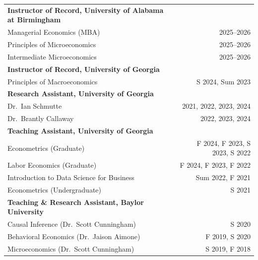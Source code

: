 \documentclass[11pt,letterpaper]{article}
\begin{document}
\begin{tabularx}{\textwidth}{@{}Xr@{}}
    \textbf{Instructor of Record, University of Alabama at Birmingham} & \\
    \hspace{2em} Managerial Economics (MBA) & 2025--2026 \\
    \hspace{2em} Principles of Microeconomics & 2025--2026 \\
    \hspace{2em} Intermediate Microeconomics & 2025--2026 \\[4pt]
    \textbf{Instructor of Record, University of Georgia} & \\
    \hspace{2em} Principles of Macroeconomics & S 2024, Sum 2023 \\[4pt]
    \textbf{Research Assistant, University of Georgia} & \\
    \hspace{2em} Dr.\ Ian Schmutte & 2021, 2022, 2023, 2024 \\
    \hspace{2em} Dr.\ Brantly Callaway & 2022, 2023, 2024 \\[4pt]
    \textbf{Teaching Assistant, University of Georgia} & \\
    \hspace{2em} Econometrics (Graduate) & F 2024, F 2023, S 2023, S 2022 \\
    \hspace{2em} Labor Economics (Graduate) & F 2024, F 2023, F 2022 \\
    \hspace{2em} Introduction to Data Science for Business & Sum 2022, F 2021 \\
    \hspace{2em} Econometrics (Undergraduate) & S 2021 \\[4pt]
    \textbf{Teaching \& Research Assistant, Baylor University} & \\
    \hspace{2em} Causal Inference (Dr.\ Scott Cunningham) & S 2020 \\
    \hspace{2em} Behavioral Economics (Dr.\ Jaison Aimone) & F 2019, S 2020 \\
    \hspace{2em} Microeconomics (Dr.\ Scott Cunningham) & S 2019, F 2018 \\
\end{tabularx}
\end{document}

